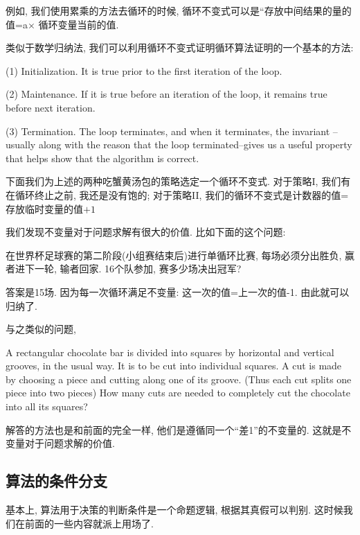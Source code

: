 例如, 我们使用累乘的方法去循环的时候, 循环不变式可以是``存放中间结果的量的值=a$\times$ 循环变量当前的值. 

类似于数学归纳法, 我们可以利用循环不变式证明循环算法证明的一个基本的方法: 

\begin{theorem}[证明循环不变式的基本方法]
(1)	Initialization. It is true prior to the first iteration of the loop.

(2) Maintenance. If it is true before an iteration of the loop, it remains true before next iteration. 

(3) Termination. The loop terminates, and when it terminates, the invariant -- usually along with the reason that the loop terminated--gives us a useful property that helps show that the algorithm is correct. 
\end{theorem}

下面我们为上述的两种吃蟹黄汤包的策略选定一个循环不变式. 对于策略I, 我们有在循环终止之前, 我还是没有饱的; 对于策略II, 我们的循环不变式是计数器的值=存放临时变量的值$+1$

我们发现不变量对于问题求解有很大的价值. 比如下面的这个问题: 

\begin{prob}
	在世界杯足球赛的第二阶段(小组赛结束后)进行单循环比赛, 每场必须分出胜负, 赢者进下一轮, 输者回家. 16个队参加, 赛多少场决出冠军? 
\end{prob} 

答案是15场. 因为每一次循环满足不变量: 这一次的值=上一次的值-1. 由此就可以归纳了. 

与之类似的问题, 

\begin{prob}
	A rectangular chocolate bar is divided into squares by horizontal and vertical grooves, in the usual way. It is to be cut into individual squares. A cut is made by choosing a piece and cutting along one of its groove. (Thus each cut splits one piece into two pieces) How many cuts are needed to completely cut the chocolate into all its squares?
\end{prob}

解答的方法也是和前面的完全一样, 他们是遵循同一个``差1''的不变量的. 这就是不变量对于问题求解的价值. 


\subsection*{算法的条件分支}

基本上, 算法用于决策的判断条件是一个命题逻辑, 根据其真假可以判别. 这时候我们在前面的一些内容就派上用场了. 

